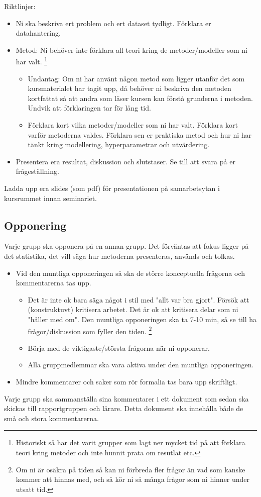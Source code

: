\documentclass[a4paper]{article}
\begin{document}
Riktlinjer:
\begin{itemize}
    \item Ni ska beskriva ert problem och ert dataset tydligt. Förklara er datahantering.
    \item Metod: Ni behöver inte förklara all teori kring de metoder/modeller som ni har valt.
    \footnote{Historiskt så har det varit grupper som lagt ner mycket tid på att förklara teori kring metoder och inte hunnit prata om resutlat etc.}
    \begin{itemize}
        \item Undantag: Om ni har använt någon metod som ligger utanför det som 
        kursmaterialet har tagit upp, då behöver ni beskriva den metoden kortfattat så
        att andra som läser kursen kan förstå grunderna i metoden. Undvik att förklaringen tar för lång tid.
        \item Förklara kort vilka metoder/modeller som ni har valt. Förklara kort varför metoderna valdes. Förklara sen er
        praktiska metod och hur ni har tänkt kring modellering, hyperparametrar och utvärdering.
        \end{itemize}
    \item Presentera era resultat, diskussion och slutstaser. Se till att svara på er frågeställning.
\end{itemize}

Ladda upp era slides (som pdf) för presentationen på samarbetsytan i kursrummet innan seminariet.


\subsection*{Opponering}
Varje grupp ska opponera på en annan grupp. Det förväntas att fokus ligger på det statistika, det vill säga hur metoderna presenteras, används och tolkas.
\begin{itemize}
    \item Vid den muntliga opponeringen så ska de större konceptuella frågorna och kommentarerna tas upp.
    \begin{itemize}
      \item Det är inte ok bara säga något i stil med "allt var bra gjort". 
      Försök att (konstruktuvt) kritisera arbetet. Det är ok att kritisera delar som ni "håller med om". 
      Den muntliga opponeringen ska ta 7-10 min, så se till ha frågor/diskussion som fyller den tiden.
      \footnote{Om ni är osäkra på tiden så kan ni förbreda fler frågor än vad som kanske
      kommer att hinnas med, och så kör ni så många frågor som ni hinner under utsatt tid.} 
      \item Börja med de viktigaste/största frågorna när ni opponerar.
      \item Alla gruppmedlemmar ska vara aktiva under den muntliga opponeringen.
    \end{itemize}
    \item Mindre kommentarer och saker som rör formalia tas bara upp skriftligt.
\end{itemize}
Varje grupp ska sammanställa sina kommentarer i ett dokument som sedan ska skickas till rapportgruppen och lärare. Detta dokument ska innehålla både de små och stora kommentarerna.
\end{document}
